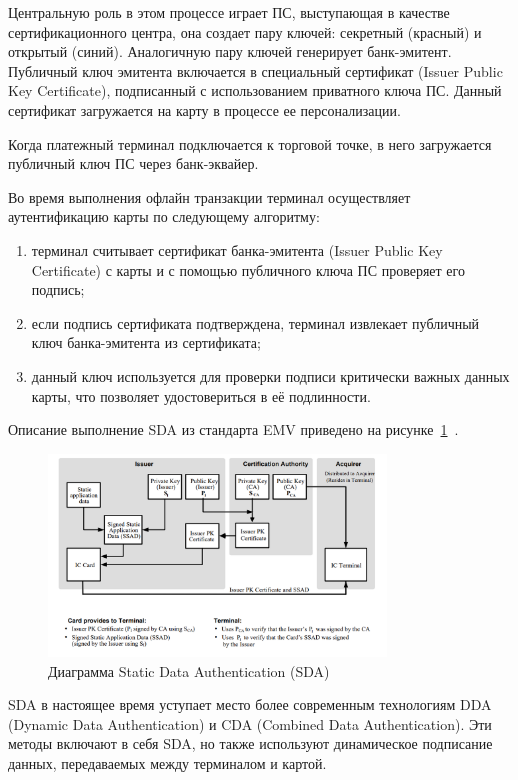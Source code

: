 Центральную роль в этом процессе играет ПС, выступающая в качестве сертификационного центра, она создает пару ключей: секретный (красный) и открытый (синий).
Аналогичную пару ключей генерирует банк-эмитент.
Публичный ключ эмитента включается в специальный сертификат (Issuer Public Key Certificate), подписанный с использованием приватного ключа ПС.
Данный сертификат загружается на карту в процессе ее персонализации.

Когда платежный терминал подключается к торговой точке, в него загружается публичный ключ ПС через банк-эквайер.

Во время выполнения офлайн транзакции терминал осуществляет аутентификацию карты по следующему алгоритму:

\begin{enumerate}
    \item терминал считывает сертификат банка-эмитента (Issuer Public Key Certificate) с карты и с помощью публичного ключа ПС проверяет его подпись;
    \item если подпись сертификата подтверждена, терминал извлекает публичный ключ банка-эмитента из сертификата;
    \item данный ключ используется для проверки подписи критически важных данных карты, что позволяет удостовериться в её подлинности.
\end{enumerate}


Описание выполнение SDA из стандарта EMV приведено на рисунке~\ref{fig:emv_offline_sda}~\cite{emv_book_2}.

\begin{figure}[H]
    \centering
    \includegraphics[width=0.8\textwidth]{images/research/emv_offline_sda}
    \caption{\centering Диаграмма Static Data Authentication (SDA)}
    \label{fig:emv_offline_sda}
\end{figure}

SDA в настоящее время уступает место более современным технологиям DDA (Dynamic Data Authentication) и CDA (Combined Data Authentication).
Эти методы включают в себя SDA, но также используют динамическое подписание данных, передаваемых между терминалом и картой.

